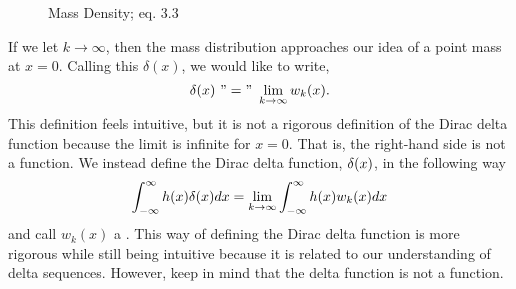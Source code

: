 \begin{figure}
    \centering
    \caption{Mass Density;  eq. 3.3}
\end{figure}

If we let \(k \rightarrow \infty\), then the mass distribution approaches our idea of a point mass at \(x=0\). Calling this \(\delta(x)\), we would like to write,
\begin{equation} \label{eq:deltaSeqLim}
    \delta(x)\ "="\ \lim_{k\rightarrow \infty} w_k(x).
\end{equation}
This definition feels intuitive, but it is not a rigorous definition of the Dirac delta function because the limit is infinite for \(x=0\). That is, the right-hand side is not a function. We instead define the Dirac delta function, \(\delta(x)\), in the following way
\begin{equation}
    \int_{-\infty}^{\infty} h(x)\delta(x)dx = \lim_{k\rightarrow \infty}\int_{-\infty}^{\infty} h(x)w_k(x)dx
\end{equation}
and call \(w_k(x)\) a . This way of defining the Dirac delta function is more rigorous while still being intuitive because it is related to our understanding of delta sequences. However, keep in mind that the delta function is not a function.

